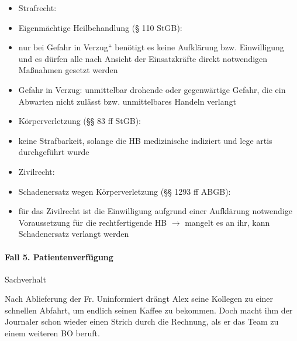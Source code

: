 \documentclass{article}
\begin{document}
\begin{itemize}
\item[] Strafrecht:

\item Eigenm\"achtige Heilbehandlung ({\S} 110 StGB): 

\end{itemize}
\begin{itemize}
\item nur bei {\quotedblbase}Gefahr in Verzug{\textquotedblleft}
ben\"otigt es keine Aufkl\"arung bzw. Einwilligung und es d\"urfen alle
nach Ansicht der Einsatzkr\"afte direkt notwendigen Ma{\ss}nahmen
gesetzt werden

\item Gefahr in Verzug: unmittelbar drohende oder gegenw\"artige Gefahr,
die ein Abwarten nicht zul\"asst bzw. unmittelbares Handeln verlangt

\end{itemize}
\begin{itemize}
\item K\"orperverletzung ({\S}{\S} 83 ff StGB):

\end{itemize}
\begin{itemize}
\item keine Strafbarkeit, solange die HB medizinische indiziert und lege
artis durchgef\"uhrt wurde

\end{itemize}
\begin{itemize}
\item[] Zivilrecht:

\item Schadenersatz wegen K\"orperverletzung ({\S}{\S} 1293 ff ABGB):

\end{itemize}
\begin{itemize}
\item f\"ur das Zivilrecht ist die Einwilligung aufgrund einer
Aufkl\"arung notwendige Voraussetzung f\"ur die rechtfertigende HB
${\rightarrow}$ mangelt es an ihr, kann Schadenersatz verlangt werden

\end{itemize}
\paragraph[Fall 5. Patientenverf\"ugung]{Fall 5. Patientenverf\"ugung}
Sachverhalt

Nach Ablieferung der Fr. Uninformiert dr\"angt Alex seine Kollegen zu
einer schnellen Abfahrt, um endlich seinen Kaffee zu bekommen. Doch
macht ihm der Journaler schon wieder einen Strich durch die Rechnung,
als er das Team zu einem weiteren BO beruft. 
\end{document}
